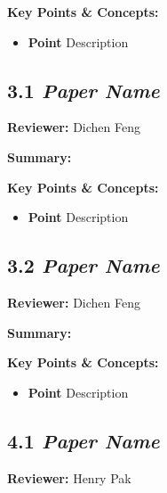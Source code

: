\documentclass{article}
\begin{document}
\vspace{0.3cm}

\textbf{Key Points \& Concepts:}
\begin{itemize}
  \item \textbf{Point} Description
\end{itemize}

\subsection*{3.1 \textit{Paper Name}}

\hspace*{\parindent}\textbf{Reviewer:} Dichen Feng

\vspace{0.3cm}

\textbf{Summary:}

\vspace{0.3cm}

\textbf{Key Points \& Concepts:}
\begin{itemize}
  \item \textbf{Point} Description
\end{itemize}

\subsection*{3.2 \textit{Paper Name}}

\hspace*{\parindent}\textbf{Reviewer:} Dichen Feng

\vspace{0.3cm}

\textbf{Summary:}

\vspace{0.3cm}

\textbf{Key Points \& Concepts:}
\begin{itemize}
  \item \textbf{Point} Description
\end{itemize}

\subsection*{4.1 \textit{Paper Name}}

\hspace*{\parindent}\textbf{Reviewer:} Henry Pak
\end{document}
